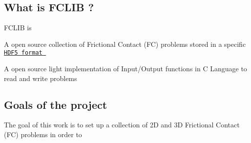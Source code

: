 \hypertarget{index_whatis}{}\subsection{What is F\-C\-L\-I\-B ?}\label{index_whatis}
F\-C\-L\-I\-B is 
\begin{DoxyItemize}
\item A open source collection of Frictional Contact (F\-C) problems stored in a specific \href{http://www.hdfgroup.org/HDF5/}{\tt H\-D\-F5 format } 
\item A open source light implementation of Input/\-Output functions in C Language to read and write problems  
\end{DoxyItemize}\hypertarget{index_goals}{}\subsection{Goals of the project}\label{index_goals}
The goal of this work is to set up a collection of 2\-D and 3\-D Frictional Contact (F\-C) problems in order to


